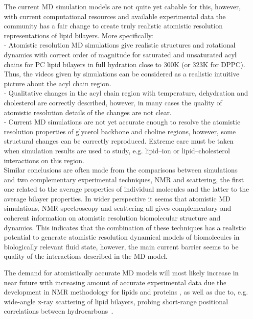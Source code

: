 \documentclass[aps,prl,superscriptaddress,twocolumn]{revtex4}
\begin{document}
The current MD simulation models are not quite yet cabable for this,
however, with current computational resources and available experimental
data the community has a fair change to create truly realistic atomistic resolution 
representations of lipid bilayers. More specifically: \\
- Atomistic resolution MD simulations give realistic structures and rotational dynamics
with correct order of magnitude for saturated and unsaturated acyl chains for PC lipid 
bilayers in full hydration close to 300K (or 323K for DPPC). Thus, the videos given
by simulations can be considered as a realistic intuitive picture about the acyl chain region.\\
- Qualitative changes in the acyl chain region with temperature, dehydration and cholesterol are
correctly described, however, in many cases the quality of atomistic resolution details of the
changes are not clear. \\
- Current MD simulations are not yet accurate enough to resolve the atomistic resolution 
properties of glycerol backbone and choline regions, however, some structural changes can be 
correctly reproduced. Extreme care must be taken when simulation results are used to study, 
e.g. lipid--ion or lipid--cholesterol interactions on this region. \\

Similar conclusions are often made from the comparisons between simulations and two complementary 
experimental techniques, NMR and scattering, the first one related to the average properties
of individual molecules and the latter to the average bilayer properties. 
In wider perspective it seems that atomistic MD simulations, NMR spectroscopy and scattering all gives
complementary and coherent information on atomistic resolution biomolecular structure and dynamics. 
This indicates that the combination of these techniques has a realistic potential to generate atomistic 
resolution dynamical models of biomolecules in biologically relevant fluid state, however, the
main current barrier seems to be quality of the interactions described in the MD model.

The demand for atomistically accurate MD models will most likely increase in near future with increasing
amount of accurate experimental data due the development in NMR methodology  
for lipids \cite{ferreira13,leftin13,leftin14,ferreira15} and proteins \cite{hansen15}, 
as well as due to, e.g. wide-angle x-ray scattering of lipid bilayers, probing short-range positional 
correlations between hydrocarbons~\cite{spaar.2003}. 
\end{document}
